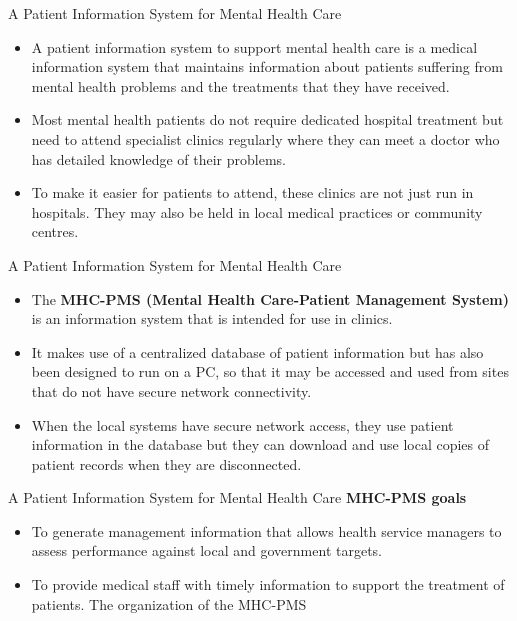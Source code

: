 \documentclass{beamer}
\begin{document}
\begin{frame}{A Patient Information System for Mental Health Care}
\begin{itemize}
	\item A patient information system to support mental health care is a medical information system that maintains information about patients suffering from mental health problems and the treatments that they have received.
	\item Most mental health patients do not require dedicated hospital treatment but need to attend specialist clinics regularly where they can meet a doctor who has detailed knowledge of their problems. 
	\item To make it easier for patients to attend, these clinics are not just run in hospitals. They may also be held in local medical practices or community centres. 
	
\end{itemize}
\end{frame}
\begin{frame}{A Patient Information System for Mental Health Care}
	\begin{itemize}
		\item The \textbf{MHC-PMS (Mental Health Care-Patient Management System)} is an information 
		system that is intended for use in clinics.
		\item It makes use of a centralized database of patient information but has also been designed 
		to run on a PC, so that it may be accessed and used from sites that do not have secure 
		network connectivity. 
		\item When the local systems have secure network access, they use patient information in the 
		database but they can download and use local copies of patient records when they are 
		disconnected.
	\end{itemize}
\end{frame}
\begin{frame}{A Patient Information System for Mental Health Care}
	\textbf{MHC-PMS goals}
	\begin{itemize}
		\item To generate management information that allows health service managers to assess 
		performance against local and government targets.
		\item To provide medical staff with timely information to support the treatment of patients.
		The organization of the MHC-PMS
	\end{itemize}
\end{frame}
\end{document}
